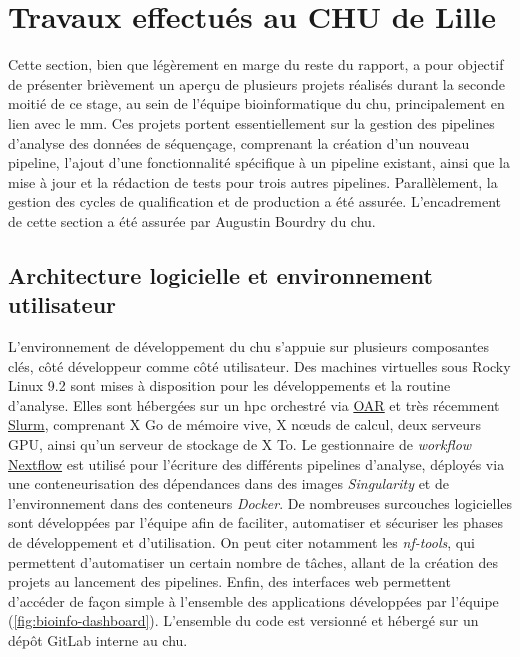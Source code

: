 \chapter{Travaux effectués au CHU de Lille}

Cette section, bien que légèrement en marge du reste du rapport, a pour objectif de présenter brièvement un aperçu 
de plusieurs projets réalisés durant la seconde moitié de ce stage, au sein de l'équipe bioinformatique du \gls{chu}, 
principalement en lien avec le \gls{mm}. Ces projets portent essentiellement sur la gestion des pipelines d'analyse 
des données de séquençage, comprenant la création d'un nouveau pipeline, l'ajout d'une fonctionnalité spécifique à 
un pipeline existant, ainsi que la mise à jour et la rédaction de tests pour trois autres pipelines. Parallèlement, 
la gestion des cycles de qualification et de production a été assurée. L'encadrement de cette section a été assurée par 
Augustin Bourdry du \gls{chu}.

\section{Architecture logicielle et environnement utilisateur}

L'environnement de développement du \gls{chu} s'appuie sur plusieurs composantes clés, côté développeur comme côté utilisateur.
Des machines virtuelles sous Rocky Linux 9.2 sont mises à disposition pour les développements et la routine d'analyse.
Elles sont hébergées sur un \gls{hpc} orchestré via \href{https://oar.imag.fr/}{OAR} et très récemment \href{https://slurm.schedmd.com/documentation.html}{Slurm},  
comprenant X Go de mémoire vive, X nœuds de calcul, deux serveurs GPU, ainsi qu'un serveur de stockage de X To.
Le gestionnaire de \textit{workflow} \href{https://www.nextflow.io/}{Nextflow} est utilisé pour l'écriture des différents pipelines d'analyse, 
déployés via une conteneurisation des dépendances dans des images \textit{Singularity} et de l'environnement dans des conteneurs \textit{Docker}.
De nombreuses surcouches logicielles sont développées par l'équipe afin de faciliter, automatiser et sécuriser les phases de développement et d'utilisation.
On peut citer notamment les \textit{nf-tools}, qui permettent d'automatiser un certain nombre de tâches, allant de la création des projets au lancement des pipelines.
Enfin, des interfaces web permettent d'accéder de façon simple à l'ensemble des applications développées par l'équipe (\autoref{fig:bioinfo-dashboard}).
L'ensemble du code est versionné et hébergé sur un dépôt GitLab interne au \gls{chu}.

